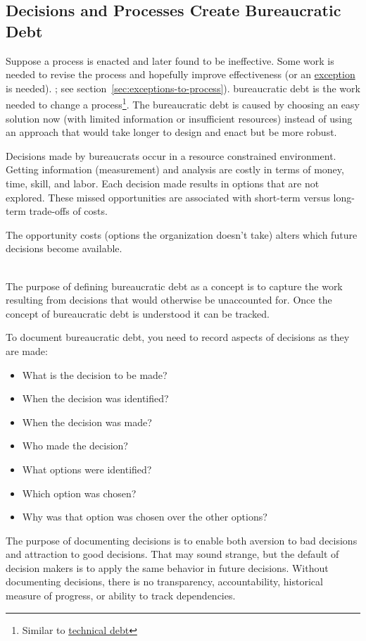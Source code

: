 \subsection*{Decisions and Processes Create Bureaucratic Debt\label{sec:bureaucratic-debt}}


Suppose a \gls{process} is enacted and later found to be ineffective. Some work is needed to revise the process and hopefully improve effectiveness (or an \hyperref[sec:exceptions-to-process]{exception} is needed).
\ifsectionref
; see section~\ref{sec:exceptions-to-process}).
\fi
\gls{bureaucratic debt} is 
 the work needed to change a process\footnote{Similar to \href{https://en.wikipedia.org/wiki/Technical_debt}{technical debt}
}. 
The bureaucratic debt is caused by choosing an easy solution now (with limited information or insufficient resources) instead of using an approach that would take longer to design and enact but be more robust.


Decisions made by \glspl{bureaucrat} occur in a resource constrained environment.
Getting information (measurement) and analysis are costly in terms of money, time, skill, and labor.
Each decision made results in options that are not explored. These missed opportunities are associated with short-term versus long-term trade-offs of costs.

The opportunity costs (options the organization doesn't take) alters which future decisions become available.

\ \\

The purpose of defining bureaucratic debt as a concept is to capture the work resulting from decisions that would otherwise be unaccounted for.
Once the concept of bureaucratic debt is understood it can be tracked.

To document bureaucratic debt, you need to record aspects of decisions as they are made:
\begin{itemize}
    \item What is the decision to be made?
    \item When the decision was identified?
    \item When the decision was made?
    \item Who made the decision?
    \item What options were identified?
    \item Which option was chosen?
    \item Why was that option was chosen over the other options?
\end{itemize}
The purpose of documenting decisions is to enable both aversion to bad decisions and attraction to good decisions. That may sound strange, but the default of decision makers is to apply the same behavior in future decisions. 
Without documenting decisions, there is no transparency, accountability, historical measure of progress, or ability to track dependencies. 

